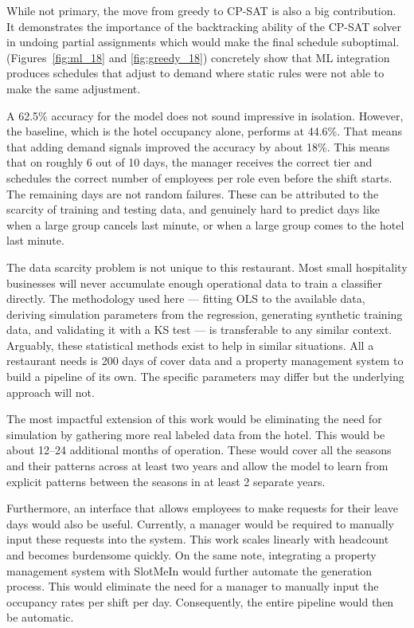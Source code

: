 \documentclass[12pt,a4paper,oneside]{article}
\begin{document}
While not primary, the move from greedy to CP-SAT is also a big contribution. It demonstrates the importance of the backtracking ability of the CP-SAT solver in undoing partial assignments which would make the final schedule suboptimal. (Figures~\ref{fig:ml_18} and \ref{fig:greedy_18}) concretely show that ML integration produces schedules that adjust to demand where static rules were not able to make the same adjustment.

A 62.5\% accuracy  for the model does not sound impressive in isolation. However, the baseline, which is the hotel occupancy alone, performs at 44.6\%. That means that adding demand signals improved the accuracy by about 18\%. This means that on roughly 6 out of 10 days, the manager receives the correct tier and schedules the correct number of employees per role even before the shift starts. The remaining days are not random failures. These can be attributed to the scarcity of training and testing data, and genuinely hard to predict days like when a large group cancels last minute, or when a large group comes to the hotel last minute. 

The data scarcity problem is not unique to this restaurant. Most small hospitality businesses will never accumulate enough operational data to train a classifier directly. The methodology used here --- fitting OLS to the available data, deriving simulation parameters from the regression, generating synthetic training data, and validating it with a KS test --- is transferable to any similar context. Arguably, these statistical methods exist to help in similar situations. All a restaurant needs is 200 days of cover data and a property management system to build a pipeline of its own.  The specific parameters may differ but the underlying approach will not.


\label{sec:future work}
The most impactful extension of this work would be eliminating the need for simulation by gathering more real labeled data from the hotel. This would be about 12--24 additional months of operation. These would cover all the seasons and their patterns across at least two years and allow the model to learn from explicit patterns between the seasons in at least 2 separate years.


Furthermore, an interface that allows employees to make requests for their leave days would also be useful. Currently, a manager would be required to manually input these requests into the system. This work scales linearly with headcount and becomes burdensome quickly. On the same note, integrating a property management system with SlotMeIn would further automate the generation process. This would eliminate the need for a manager to manually input the occupancy rates per shift per day. Consequently, the entire pipeline would then be automatic.
\end{document}
